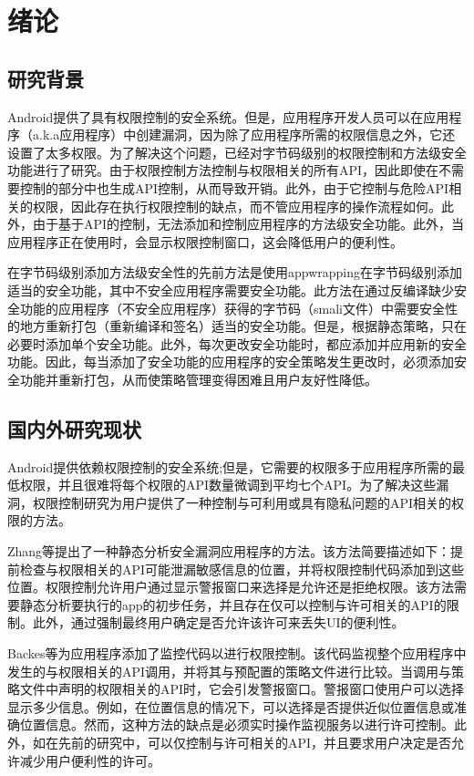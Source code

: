\chapter{绪论}
	
	\section{研究背景}
		Android提供了具有权限控制的安全系统。但是，应用程序开发人员可以在应用程序（a.k.a应用程序）中创建漏洞，因为除了应用程序所需的权限信息之外，它还设置了太多权限。为了解决这个问题，已经对字节码级别的权限控制和方法级安全功能进行了研究\cite{Backes_appguard_2013}\cite{zhang_efficient_2014}\cite{Neisse_privacy_2016}\cite{Lee_appwrapping_2017}。由于权限控制方法控制与权限相关的所有API，因此即使在不需要控制的部分中也生成API控制，从而导致开销。此外，由于它控制与危险API相关的权限，因此存在执行权限控制的缺点，而不管应用程序的操作流程如何。此外，由于基于API的控制，无法添加和控制应用程序的方法级安全功能。此外，当应用程序正在使用时，会显示权限控制窗口，这会降低用户的便利性。
		
		在字节码级别添加方法级安全性的先前方法\cite{Lee_appwrapping_2017}是使用appwrapping在字节码级别添加适当的安全功能，其中不安全应用程序需要安全功能。此方法在通过反编译缺少安全功能的应用程序（不安全应用程序）获得的字节码（smali文件）中需要安全性的地方重新打包（重新编译和签名）适当的安全功能。但是，根据静态策略，只在必要时添加单个安全功能。此外，每次更改安全功能时，都应添加并应用新的安全功能。因此，每当添加了安全功能的应用程序的安全策略发生更改时，必须添加安全功能并重新打包，从而使策略管理变得困难且用户友好性降低。
		
	\section{国内外研究现状}
		Android提供依赖权限控制的安全系统;但是，它需要的权限多于应用程序所需的最低权限，并且很难将每个权限的API数量微调到平均七个API\cite{Felt_android_2011}。为了解决这些漏洞，权限控制研究为用户提供了一种控制与可利用或具有隐私问题的API相关的权限的方法。
		
		Zhang等提出了一种静态分析安全漏洞应用程序的方法\cite{zhang_efficient_2014}。该方法简要描述如下：提前检查与权限相关的API可能泄漏敏感信息的位置，并将权限控制代码添加到这些位置。权限控制允许用户通过显示警报窗口来选择是允许还是拒绝权限。该方法需要静态分析要执行的app的初步任务，并且存在仅可以控制与许可相关的API的限制。此外，通过强制最终用户确定是否允许该许可来丢失UI的便利性。

		Backes等为应用程序添加了监控代码以进行权限控制\cite{Backes_appguard_2013}。该代码监视整个应用程序中发生的与权限相关的API调用，并将其与预配置的策略文件进行比较。当调用与策略文件中声明的权限相关的API时，它会引发警报窗口。警报窗口使用户可以选择显示多少信息。例如，在位置信息的情况下，可以选择是否提供近似位置信息或准确位置信息。然而，这种方法的缺点是必须实时操作监视服务以进行许可控制。此外，如在先前的研究中，可以仅控制与许可相关的API，并且要求用户决定是否允许减少用户便利性的许可。


